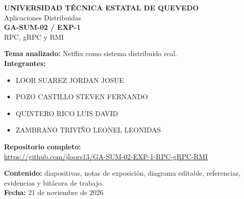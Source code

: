 \documentclass[11pt]{article}
\begin{document}
\begin{center}
{\Large\bfseries\color{uteqblue} UNIVERSIDAD TÉCNICA ESTATAL DE QUEVEDO}\\[6pt]
{\large Aplicaciones Distribuidas}\\[18pt]
{\LARGE\bfseries GA-SUM-02 / EXP-1}\\[4pt]
{\Large RPC, gRPC y RMI}\\[18pt]
\end{center}

\textbf{Tema analizado:} Netflix como sistema distribuido real.\\[8pt]
\textbf{Integrantes:}
\begin{itemize}[nosep]
\item LOOR SUAREZ JORDAN JOSUE
\item POZO CASTILLO STEVEN FERNANDO
\item QUINTERO RICO LUIS DAVID
\item ZAMBRANO TRIVIÑO LEONEL LEONIDAS
\end{itemize}
\vspace{12pt}
\textbf{Repositorio completo:}\\[4pt]
\url{https://github.com/jloors13/GA-SUM-02-EXP-1-RPC-gRPC-RMI}

\vfill
\textbf{Contenido:} diapositivas, notas de exposición, diagrama editable,
referencias, evidencias y bitácora de trabajo.\\[8pt]
\textbf{Fecha:} 21 de noviembre de 2026
\end{document}
